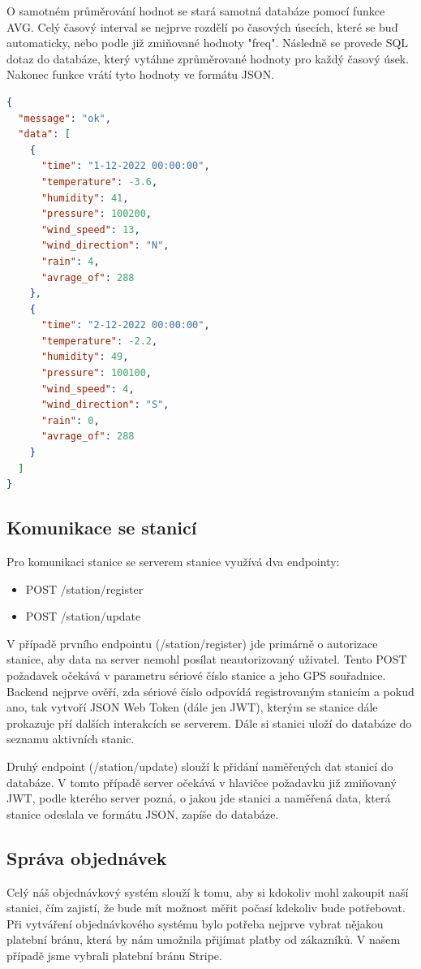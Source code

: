 O samotném průměrování hodnot se stará samotná databáze pomocí funkce AVG. Celý časový interval se nejprve rozdělí po časových úsecích, které se buď automaticky, nebo podle již zmiňované hodnoty "freq".
Následně se provede SQL dotaz do databáze, který vytáhne zprůměrované hodnoty pro každý časový úsek. Nakonec funkce vrátí tyto hodnoty ve formátu JSON.
\begin{lstlisting}[language=json,firstnumber=1, caption=Příklad požadavku /stats/{gps}]
{
  "message": "ok",
  "data": [
    {
      "time": "1-12-2022 00:00:00",
      "temperature": -3.6,
      "humidity": 41,
      "pressure": 100200,
      "wind_speed": 13,
      "wind_direction": "N",
      "rain": 4,
      "avrage_of": 288
    },
    {
      "time": "2-12-2022 00:00:00",
      "temperature": -2.2,
      "humidity": 49,
      "pressure": 100100,
      "wind_speed": 4,
      "wind_direction": "S",
      "rain": 0,
      "avrage_of": 288
    }
  ]
}
\end{lstlisting}

\subsection{Komunikace se stanicí} \label{komunikace}
Pro komunikaci stanice se serverem stanice využívá dva endpointy:
\begin{itemize}
  \item POST /station/register
  \item POST /station/update
\end{itemize}
V případě prvního endpointu (/station/register) jde primárně o autorizace stanice, aby data na server nemohl posílat neautorizovaný uživatel. Tento POST požadavek očekává v parametru 
sériové číslo stanice a jeho GPS souřadnice. Backend nejprve ověří, zda sériové číslo odpovídá registrovaným stanicím a pokud ano, tak vytvoří JSON Web Token (dále jen JWT),
kterým se stanice dále prokazuje pří dalších interakcích se serverem. Dále si stanici uloží do databáze do seznamu aktivních stanic.

Druhý endpoint (/station/update) slouží k přidání naměřených dat stanicí do databáze. V tomto případě server očekává v hlavičce požadavku již zmiňovaný JWT,
podle kterého server pozná, o jakou jde stanici a naměřená data, která stanice odeslala ve formátu JSON, zapíše do databáze.

\subsection{Správa objednávek}
Celý náš objednávkový systém slouží k tomu, aby si kdokoliv mohl zakoupit naší stanici, čím zajistí, že bude mít možnost měřit počasí kdekoliv bude potřebovat. 
Při vytváření objednávkového systému bylo potřeba nejprve vybrat nějakou platební bránu, která by nám umožnila přijímat platby od zákazníků. V našem případě jsme vybrali platební bránu Stripe.

